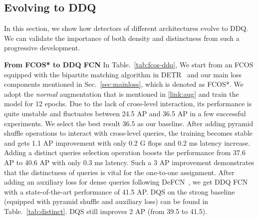 \documentclass[10pt,twocolumn,letterpaper]{article}
\begin{document}
\subsection{Evolving to DDQ}
In this section, we show how  detectors of different architectures evolve to DDQ. We can validate the importance of both density and distinctness from such a progressive development.

\noindent\textbf{From FCOS* to DDQ FCN} In Table.~\ref{tab:fcos-ddq},  We start from an FCOS equipped with the bipartite matching algorithm in DETR~\cite{carion2020end} and our main loss components mentioned in Sec.~\ref{sec:mainloss}, which is denoted as FCOS*. We adopt the \emph{normal} augmentation that is mentioned in \ref{link:aug} and train the model for 12 epochs. Due to the lack of cross-level interaction, its performance is quite unstable and fluctuates between 24.5 AP and 36.5 AP in a few successful experiments. We select the best result 36.5 as our baseline. After adding pyramid shuffle operations to interact with cross-level queries, the training becomes stable and gets 1.1 AP improvement with only 0.2 G flops and 0.2 ms latency increase. Adding a distinct queries selection operation boosts the performance from 37.6 AP to 40.6 AP with only 0.3 ms latency. Such a 3 AP improvement demonstrates that the distinctness of queries is vital for the one-to-one assignment. After adding an auxiliary loss for dense queries following DeFCN~\cite{wang2021end}, we get DDQ FCN with a state-of-the-art performance of 41.5 AP. DQS on the strong baseline (equipped with pyramid shuffle and
auxiliary loss) can be found in Table.~\ref{tab:distinct}. DQS still improves 2 AP (from 39.5 to 41.5).
\begin{table}[!h]
    \centering
    \vspace{-2mm}
    \caption{\textbf{From FCOS* to DDQ FCN.} PS stands for pyramid shuffle, and DQS means distinct queries selection operation. We also report the latency(L) and the flops(F).}
\vspace{-3mm}
\label{tab:fcos-ddq}
\end{table}
\end{document}
